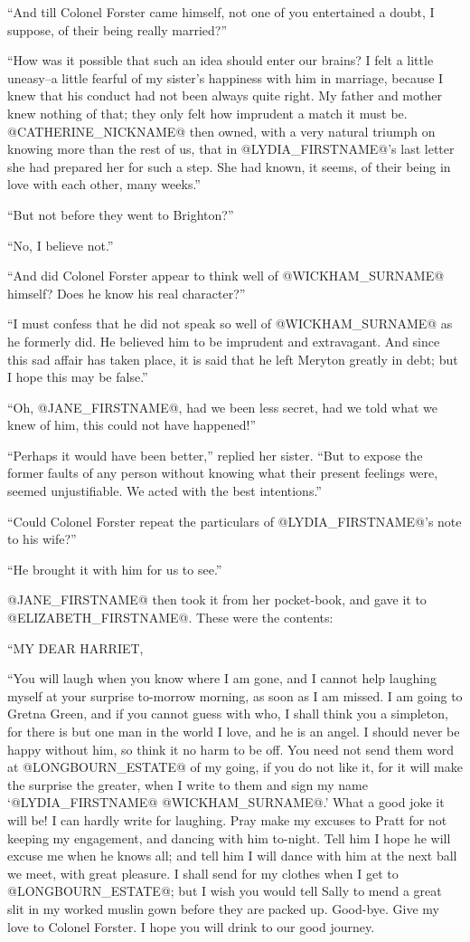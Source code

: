 ``And till Colonel Forster came himself, not one of you entertained a
doubt, I suppose, of their being really married?''

``How was it possible that such an idea should enter our brains? I felt
a little uneasy--a little fearful of my sister's happiness with him
in marriage, because I knew that his conduct had not been always quite
right. My father and mother knew nothing of that; they only felt how
imprudent a match it must be. @CATHERINE_NICKNAME@ then owned, with a very natural
triumph on knowing more than the rest of us, that in @LYDIA_FIRSTNAME@'s last letter
she had prepared her for such a step. She had known, it seems, of their
being in love with each other, many weeks.''

``But not before they went to Brighton?''

``No, I believe not.''

``And did Colonel Forster appear to think well of @WICKHAM_SURNAME@ himself? Does
he know his real character?''

``I must confess that he did not speak so well of @WICKHAM_SURNAME@ as he formerly
did. He believed him to be imprudent and extravagant. And since this sad
affair has taken place, it is said that he left Meryton greatly in debt;
but I hope this may be false.''

``Oh, @JANE_FIRSTNAME@, had we been less secret, had we told what we knew of him,
this could not have happened!''

``Perhaps it would have been better,'' replied her sister. ``But to expose
the former faults of any person without knowing what their present
feelings were, seemed unjustifiable. We acted with the best intentions.''

``Could Colonel Forster repeat the particulars of @LYDIA_FIRSTNAME@'s note to his
wife?''

``He brought it with him for us to see.''

@JANE_FIRSTNAME@ then took it from her pocket-book, and gave it to @ELIZABETH_FIRSTNAME@. These
were the contents:

``MY DEAR HARRIET,

``You will laugh when you know where I am gone, and I cannot help
laughing myself at your surprise to-morrow morning, as soon as I am
missed. I am going to Gretna Green, and if you cannot guess with who,
I shall think you a simpleton, for there is but one man in the world I
love, and he is an angel. I should never be happy without him, so think
it no harm to be off. You need not send them word at @LONGBOURN_ESTATE@ of my
going, if you do not like it, for it will make the surprise the greater,
when I write to them and sign my name `@LYDIA_FIRSTNAME@ @WICKHAM_SURNAME@.' What a good joke
it will be! I can hardly write for laughing. Pray make my excuses to
Pratt for not keeping my engagement, and dancing with him to-night.
Tell him I hope he will excuse me when he knows all; and tell him I will
dance with him at the next ball we meet, with great pleasure. I shall
send for my clothes when I get to @LONGBOURN_ESTATE@; but I wish you would tell
Sally to mend a great slit in my worked muslin gown before they are
packed up. Good-bye. Give my love to Colonel Forster. I hope you will
drink to our good journey.


